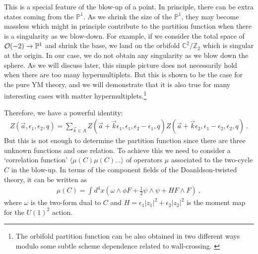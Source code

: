 \documentclass[letterpaper, 11pt]{article}
\def\IC{\mathbb{C}}
\def\IP{\mathbb{P}}
\def\IZ{\mathbb{Z}}
\def\CO{{\cal O}}
\def\e{\epsilon}
\def\half{\frac{1}{2}}
\begin{document}
This is a special feature of the blow-up of a point. In principle, there can be extra states coming from the $\IP^1$. As we shrink the size of the $\IP^1$, they may become massless which might in principle contribute to the partition function when there is a singularity as we blow-down. 
For example, if we consider the total space of $\CO(-2) \to \IP^1$ and shrink the base, we land on the orbifold $\IC^2/\IZ_2$ which is singular at the origin. In our case, we do not obtain any singularity as we blow down the sphere.  As we will discuss later, this simple picture does not necessarily hold when there are too many hypermultiplets. But this is  shown to be the case for the pure YM theory, and we will demonstrate that it is also true for many interesting cases with matter hypermultiplets.\footnote{The orbifold partition function can be also obtained in two different ways modulo some subtle scheme dependence related to wall-crossing. \cite{Ito:2013kpa}}

Therefore, we have a powerful identity:
\begin{align}
 Z(\vec{a}, \e_1, \e_2, q) = \sum_{\vec{k} \in \Lambda} Z(\vec{a}+ \vec{k} \e_1, \e_1, \e_2 - \e_1, q) Z(\vec{a}+\vec{k} \e_2, \e_1 - \e_2, \e_2, q) \ . 
\end{align}
But this is not enough to determine the partition function since there are three unknown functions and one relation. To achieve this we need to consider a `correlation function' $\langle \mu(C) \mu(C) \ldots \rangle$ of operators $\mu$ associated to the two-cycle $C$ in the blow-up. In terms of the component fields of the Doanldson-twisted theory, it can be written as
\begin{align} \label{eq:muC}
\mu(C) = \int d^4 x \left( \omega \wedge \phi F + \half \psi \wedge \psi + H F \wedge F \right)  \ , 
\end{align}
where $\omega$ is the two-form dual to $C$ and $H = \e_1 |z_1|^2 + \e_2 |z_2|^2$ is the moment map for the $U(1)^2$ action. 
\end{document}
